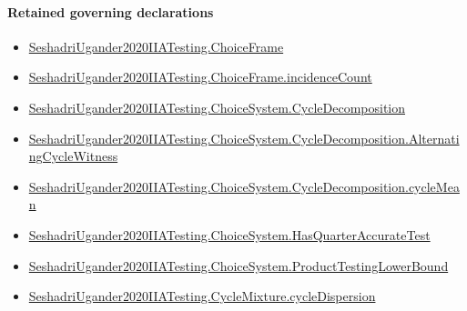 \documentclass[10pt]{article}
\begin{document}
\paragraph{Retained governing declarations}
\begin{itemize}\raggedright
\item \hyperlink{paper-prerequisite-0b24d39c6f4d1898}{Seshadri\allowbreak{}Ugander2020\allowbreak{}IIA\allowbreak{}Testing.\allowbreak{}Choice\allowbreak{}Frame}
\item \hyperlink{governing-declaration-01f88aa0e8a82d94}{Seshadri\allowbreak{}Ugander2020\allowbreak{}IIA\allowbreak{}Testing.\allowbreak{}Choice\allowbreak{}Frame.\allowbreak{}incidence\allowbreak{}Count}
\item \hyperlink{paper-prerequisite-7ec2ce004f72e29f}{Seshadri\allowbreak{}Ugander2020\allowbreak{}IIA\allowbreak{}Testing.\allowbreak{}Choice\allowbreak{}System.\allowbreak{}Cycle\allowbreak{}Decomposition}
\item \hyperlink{paper-prerequisite-7c17e7188aae79a0}{Seshadri\allowbreak{}Ugander2020\allowbreak{}IIA\allowbreak{}Testing.\allowbreak{}Choice\allowbreak{}System.\allowbreak{}Cycle\allowbreak{}Decomposition.\allowbreak{}Alternating\allowbreak{}Cycle\allowbreak{}Witness}
\item \hyperlink{paper-prerequisite-4f9c0f894e80708f}{Seshadri\allowbreak{}Ugander2020\allowbreak{}IIA\allowbreak{}Testing.\allowbreak{}Choice\allowbreak{}System.\allowbreak{}Cycle\allowbreak{}Decomposition.\allowbreak{}cycle\allowbreak{}Mean}
\item \hyperlink{paper-prerequisite-663ba384bf9fbba2}{Seshadri\allowbreak{}Ugander2020\allowbreak{}IIA\allowbreak{}Testing.\allowbreak{}Choice\allowbreak{}System.\allowbreak{}Has\allowbreak{}Quarter\allowbreak{}Accurate\allowbreak{}Test}
\item \hyperlink{paper-prerequisite-46210e1105d79432}{Seshadri\allowbreak{}Ugander2020\allowbreak{}IIA\allowbreak{}Testing.\allowbreak{}Choice\allowbreak{}System.\allowbreak{}Product\allowbreak{}Testing\allowbreak{}Lower\allowbreak{}Bound}
\item \hyperlink{paper-prerequisite-d1b6db8e571d96c2}{Seshadri\allowbreak{}Ugander2020\allowbreak{}IIA\allowbreak{}Testing.\allowbreak{}Cycle\allowbreak{}Mixture.\allowbreak{}cycle\allowbreak{}Dispersion}
\end{itemize}
\end{document}
